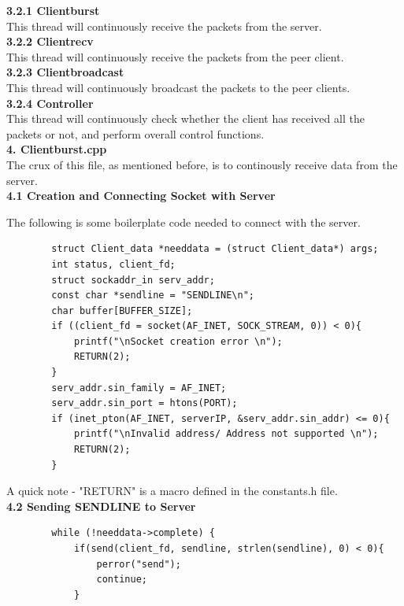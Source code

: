 \documentclass[12pt]{scrartcl}
\begin{document}
\textbf{3.2.1 Clientburst}\\
This thread will continuously receive the packets from the server.\\

\textbf{3.2.2 Clientrecv}\\
This thread will continuously receive the packets from the peer client.\\

\textbf{3.2.3 Clientbroadcast}\\
This thread will continuously broadcast the packets to the peer clients.\\

\textbf{3.2.4 Controller}\\
This thread will continuously check whether the client has received all the packets or not, and perform overall control functions.\\

\textbf{4. Clientburst.cpp}\\

The crux of this file, as mentioned before, is to continously receive data from the server. \\

\textbf{4.1 Creation and Connecting Socket with Server}

The following is some boilerplate code needed to connect with the server.

\begin{verbatim}
        struct Client_data *needdata = (struct Client_data*) args;
        int status, client_fd;
        struct sockaddr_in serv_addr;
        const char *sendline = "SENDLINE\n";
        char buffer[BUFFER_SIZE];
        if ((client_fd = socket(AF_INET, SOCK_STREAM, 0)) < 0){
            printf("\nSocket creation error \n");
            RETURN(2);
        }
        serv_addr.sin_family = AF_INET;
        serv_addr.sin_port = htons(PORT);
        if (inet_pton(AF_INET, serverIP, &serv_addr.sin_addr) <= 0){
            printf("\nInvalid address/ Address not supported \n");
            RETURN(2);
        }
\end{verbatim}

A quick note - "RETURN" is a macro defined in the constants.h file. \\

\textbf{4.2 Sending SENDLINE to Server}
\begin{verbatim}
        while (!needdata->complete) {
            if(send(client_fd, sendline, strlen(sendline), 0) < 0){
                perror("send");
                continue;
            }
\end{verbatim}
\end{document}
